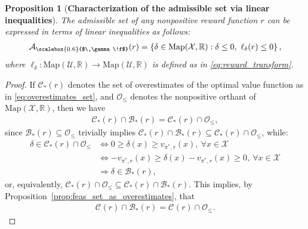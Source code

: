 \documentclass[10pt,leqno]{amsart}
\newcommand{\sml}{\scriptscriptstyle}
\newcommand{\R}{\mathbb{R}}
\newcommand{\U}{\mathcal{U}}
\newcommand{\X}{\mathcal{X}}
\newcommand{\cost}{r}
\newcommand{\vvarg}[1]{v_{#1}}
\newcommand{\f}{f}
\newcommand{\policy}{\pi}
\newcommand{\state}{x} %
\newcommand{\disc}{\gamma}
\newcommand{\advset}[2]{\mathcal{C}_{#1}(#2)}
\newcommand{\feasset}[1]{\mathcal{A}_{\scalebox{0.6}{$\,\disc\!\f$}}(#1)}
\newcommand{\orthant}{\mathcal{O}_{\sml\leq}}
\newcommand{\maps}{\text{Map}}
\newcommand{\actAdvsym}{\ell}
\newcommand{\actAdv}[1]{\actAdvsym_{#1}}
\newtheorem{proposition}[theorem]{Proposition}
\begin{document}
\begin{proposition}[\textbf{Characterization of the admissible set via linear inequalities}]\label{prop:alternative_definition_feasible_set}
    The admissible set of any nonpositive reward function $\cost$ can be expressed in terms of linear inequalities as follows:
    \begin{align}\label{eq:alternative_definition_feasible_set}
        \feasset{\cost} = \left\{\delta \in \maps(\X, \R) : \delta \leq 0, ~ \actAdv{\delta}(\cost) \leq 0\right\},
    \end{align}
    where $\actAdv{\delta} : \maps(\U, \R) \to \maps(\U, \R)$ is defined as in \eqref{eq:reward_transform}.
\end{proposition}
\begin{proof}
    If $\mathcal{C}_*(\cost)$ denotes the set of overestimates of the optimal value function as in \eqref{eq:overestimates_set}, and $\orthant$ denotes the nonpositive orthant of $\maps(\X, \R)$, then we have
    \begin{align*}
        \mathcal{C}_*(\cost) \cap \mathcal{B}_*(\cost) = \mathcal{C}_*(\cost) \cap \orthant,
    \end{align*}
    since $\mathcal{B}_*(\cost) \subseteq \orthant$ trivially implies $\mathcal{C}_*(\cost) \cap \mathcal{B}_*(\cost) \subseteq \mathcal{C}_*(\cost) \cap \orthant$, while:
    \begin{align*}
        \delta \in \mathcal{C}_*(\cost) \cap \orthant &\Longleftrightarrow 0 \geq \delta(\state) \geq \vvarg{\policy^*\!, \cost}(\state),~ \forall \state \in \X\\
        &\Longleftrightarrow -\vvarg{\policy^*\!, \cost}(\state) \geq \delta(\state) - \vvarg{\policy^*\!, \cost}(\state) \geq 0,~ \forall \state \in \X\\
        &\Longrightarrow \delta \in \mathcal{B}_*(\cost),
    \end{align*}
    or, equivalently, $\mathcal{C}_*(\cost) \cap \orthant \subseteq \mathcal{C}_*(\cost) \cap \mathcal{B}_*(\cost)$. This implies, by Proposition~\ref{prop:feas_set_as_overestimates}, that
    \begin{align*}
        \advset{}{\cost} \cap \mathcal{B}_*(\cost) = \advset{}{\cost} \cap \orthant.
    \end{align*}
\end{proof}
\end{document}
